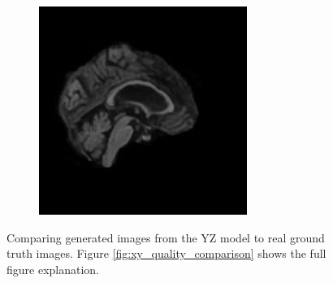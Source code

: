 \documentclass[11pt, fleqn, titlepage]{article}
\newcommand\skipperer{0.45pt}
\newcommand{\1}[1]{\mathds{1}\left[#1\right]}
\begin{document}
\begin{figure}[H]
\begin{subfigure}[b]{0.7\textwidth}
		\hskip\skipperer
		\includegraphics[width=0.22\linewidth]{imgs/082_S_0469/ALL_model_082_S_0469_yz_3}
	\end{subfigure}
	\caption{Comparing generated images from the YZ model to real ground truth images. Figure \ref{fig:xy_quality_comparison} shows the full figure explanation.}
	\label{fig:all_quality_comparison}
\end{figure}


\vspace*{-1cm} %
\end{document}
